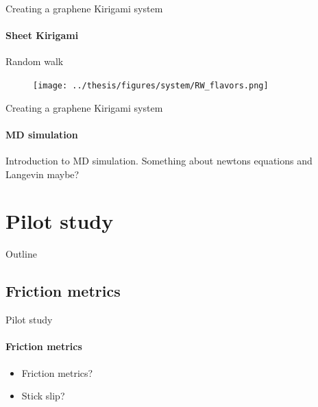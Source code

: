 \documentclass[
	10pt, %
]{beamer}
\begin{document}
%
%
\begin{frame}{Creating a graphene Kirigami system}
	\framesubtitle{Sheet Kirigami}
	Random walk 
	\begin{figure}[H]
		\centering
		\texttt{[image: ../thesis/figures/system/RW\_flavors.png]}
	\end{figure}
\end{frame}
%
%
\begin{frame}{Creating a graphene Kirigami system}
	\framesubtitle{MD simulation}
	Introduction to MD simulation. Something about newtons equations and Langevin maybe?
\end{frame}


\section{Pilot study} %
\begin{frame}{Outline}
    \tableofcontents[currentsection]
\end{frame}

\subsection{Friction metrics}
\begin{frame}{Pilot study}
	\framesubtitle{Friction metrics}

	\begin{itemize}
		\item Friction metrics?
		\item Stick slip?
	\end{itemize}
\end{frame}
%
%
\end{document}
